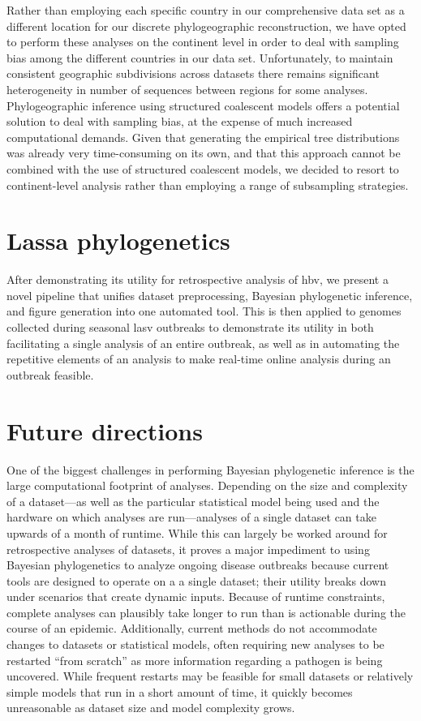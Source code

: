 Rather than employing each specific country in our comprehensive data set as a different location for our discrete phylogeographic reconstruction, we have opted to perform these analyses on the continent level in order to deal with sampling bias among the different countries in our data set.
Unfortunately, to maintain consistent geographic subdivisions across datasets there remains significant heterogeneity in number of sequences between regions for some analyses.
Phylogeographic inference using structured coalescent models\cite{de2015new, muller2018mascot} offers a potential solution to deal with sampling bias, at the expense of much increased computational demands.
Given that generating the empirical tree distributions was already very time-consuming on its own, and that this approach cannot be combined with the use of structured coalescent models, we decided to resort to continent-level analysis rather than employing a range of subsampling strategies\cite{hong2020search}.

\section{Lassa phylogenetics}

After demonstrating its utility for retrospective analysis of \gls{hbv}, we present a novel pipeline that unifies dataset preprocessing, Bayesian phylogenetic inference, and figure generation into one automated tool.
This is then applied to genomes collected during seasonal \gls{lasv} outbreaks to demonstrate its utility in both facilitating a single analysis of an entire outbreak, as well as in automating the repetitive elements of an analysis to make real-time online analysis during an outbreak feasible.

\section{Future directions}

One of the biggest challenges in performing Bayesian phylogenetic inference is the large computational footprint of analyses.
Depending on the size and complexity of a dataset---as well as the particular statistical model being used and the hardware on which analyses are run---analyses of a single dataset can take upwards of a month of runtime.
While this can largely be worked around for retrospective analyses of datasets, it proves a major impediment to using Bayesian phylogenetics to analyze ongoing disease outbreaks because current tools are designed to operate on a a single dataset; their utility breaks down under scenarios that create dynamic inputs.
Because of runtime constraints, complete analyses can plausibly take longer to run than is actionable during the course of an epidemic.
Additionally, current methods do not accommodate changes to datasets or statistical models, often requiring new analyses to be restarted ``from scratch'' as more information regarding a pathogen is being uncovered.
While frequent restarts may be feasible for small datasets or relatively simple models that run in a short amount of time, it quickly becomes unreasonable as dataset size and model complexity grows.

